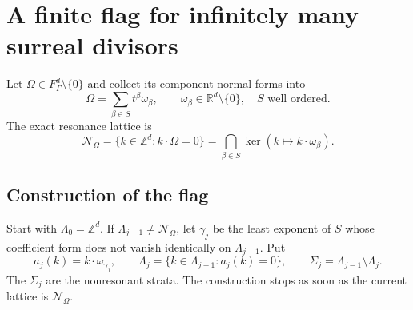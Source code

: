 \documentclass[11pt,letterpaper]{article}
\theoremstyle{definition}
\theoremstyle{remark}
\newcommand{\R}{\mathbb R}
\newcommand{\Z}{\mathbb Z}
\newcommand{\res}{\mathcal N_{\Omega}}
\numberwithin{equation}{section}
\begin{document}
\section{A finite flag for infinitely many surreal divisors}
\label{sec:flag}

Let $\Omega\in F_\Gamma^d\setminus\{0\}$ and collect its component normal
forms into
\begin{equation}\label{eq:frequency}
 \Omega=\sum_{\beta\in S}t^\beta\omega_\beta,
 \qquad \omega_\beta\in\R^d\setminus\{0\},
 \quad S\text{ well ordered}.
\end{equation}
The exact resonance lattice is
\[
 \res=\{k\in\Z^d:k\cdot\Omega=0\}
       =\bigcap_{\beta\in S}\ker(k\mapsto k\cdot\omega_\beta).
\]

\subsection{Construction of the flag}

Start with $\Lambda_0=\Z^d$.  If
$\Lambda_{j-1}\ne\res$, let $\gamma_j$ be the least exponent of $S$ whose
coefficient form does not vanish identically on $\Lambda_{j-1}$.  Put
\begin{equation}\label{eq:flag-def}
 a_j(k)=k\cdot\omega_{\gamma_j},\qquad
 \Lambda_j=\{k\in\Lambda_{j-1}:a_j(k)=0\},\qquad
 \Sigma_j=\Lambda_{j-1}\setminus\Lambda_j.
\end{equation}
The $\Sigma_j$ are the nonresonant strata.  The construction stops as soon
as the current lattice is $\res$.
\end{document}
